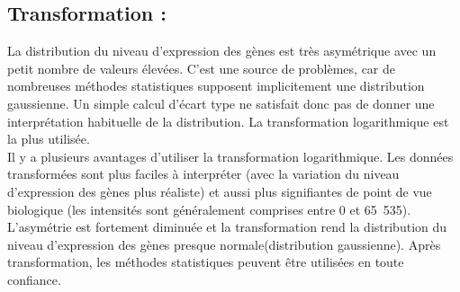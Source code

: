 \documentclass[a4paper,10pt]{article}
\begin{document}
\subsection{Transformation :}
La distribution du niveau d'expression des gènes est très asymétrique avec un petit nombre de valeurs élevées. C’est une source de problèmes, car de nombreuses méthodes statistiques supposent implicitement une distribution gaussienne. 
Un simple calcul d’écart type ne satisfait donc pas de donner une interprétation habituelle de la distribution. La transformation logarithmique est la plus utilisée. 
\\Il y a plusieurs avantages d’utiliser la transformation logarithmique. Les données transformées sont plus faciles à interpréter (avec la variation du niveau d’expression des gènes plus réaliste) et aussi plus signifiantes de point de vue biologique (les intensités sont généralement comprises entre 0 et 65 535). 
L’asymétrie est fortement diminuée et la transformation  rend la distribution du niveau d’expression des gènes presque normale(distribution gaussienne).
Après transformation, les méthodes statistiques peuvent être utilisées en toute confiance. 
\end{document}
